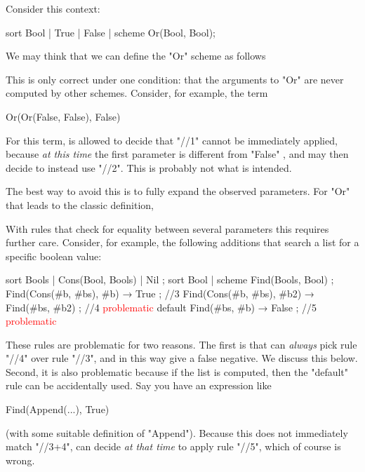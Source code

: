 \documentclass[11pt]{article} %
\begin{document}
Consider this context:
\begin{hacs}[xleftmargin=\parindent]
sort Bool | True | False | scheme Or(Bool, Bool);
\end{hacs}
We may think that we can define the "Or" scheme as follows
This is only correct under one condition: that the arguments to "Or" are never computed by other
schemes. Consider, for example, the term
\begin{hacs}[xleftmargin=\parindent]
Or(Or(False, False), False)
\end{hacs}
For this term, \HAX is allowed to decide that "//1" cannot be immediately applied, because \emph{at
  this time} the first parameter is different from "False" , and \HAX may then decide to instead use
"//2". This is probably not what is intended.

The best way to avoid this is to fully expand the observed parameters. For "Or" that leads to the
classic definition,
With rules that check for equality between several parameters this requires further care. Consider,
for example, the following additions that search a list for a specific boolean value:
\begin{hacs}[texcl,xleftmargin=\parindent]
sort Bools | Cons(Bool, Bools) | Nil ;
sort Bool | scheme Find(Bools, Bool) ;
Find(Cons(#b, #bs), #b) → True ;                      //3
Find(Cons(#b, #bs), #b2) → Find(#bs, #b2) ;           //4 \textcolor{red}{problematic}
default Find(#bs, #b) → False ;                       //5 \textcolor{red}{problematic}
\end{hacs}
These rules are problematic for two reasons. The first is that \HAX can \emph{always} pick rule
"//4" over rule "//3", and in this way give a false negative. We discuss this below. Second, it is
also problematic because if the list is computed, then the "default" rule can be accidentally
used. Say you have an expression like
\begin{hacs}[xleftmargin=\parindent]
Find(Append(...), True)
\end{hacs}
(with some suitable definition of "Append"). Because this does not immediately match "//3+4", \HAX
can decide \emph{at that time} to apply rule "//5", which of course is wrong.
\end{document}

